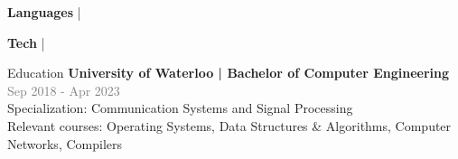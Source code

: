 \documentclass[hidelinks]{resume} %
\begin{document}
\vspace{-.05cm}
\begin{rSubsection}{\textbf{Languages} | }{}{}

\end{rSubsection}
\vspace{-.20cm}
\begin{rSubsection}{\textbf{Tech} | }{}{}

\end{rSubsection}

\vspace{-.20cm}

\begin{rSection}{Education}
\vspace{-.1cm}
{\textbf{University of Waterloo | Bachelor of Computer Engineering}} \hfill {\textcolor{gray}{\small Sep 2018 - Apr 2023}} 
\\ {Specialization: Communication Systems and Signal Processing\\Relevant courses: Operating Systems, Data Structures \& Algorithms, Computer Networks, Compilers}
\vspace{.1cm}
\end{rSection}
\end{document}
